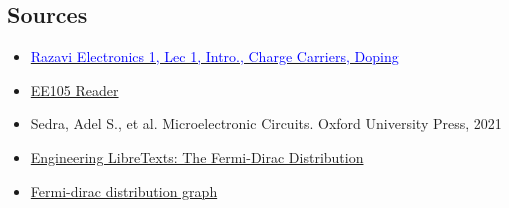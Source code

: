 \subsection{Sources}
\begin{itemize}
    \item \href{https://www.youtube.com/watch?v=yQDfVJzEymI}{\textcolor{blue}{Razavi Electronics 1, Lec 1, Intro., Charge Carriers, Doping}}
    \item \href{https://file.notion.so/f/f/048d6522-202b-48d4-b5d9-bc005bd602e2/214bf1f0-292f-48d6-9016-737d9f5da155/ee105_reader_v3.pdf?id=237a4300-3dbe-47d1-888b-ffae90d8352b&table=block&spaceId=048d6522-202b-48d4-b5d9-bc005bd602e2&expirationTimestamp=1714435200000&signature=yx-H1qvZJIodPfazOpwXX0Ce2mWMG8skOHl45xoPxus&downloadName=ee105_reader_v3.pdf}{EE105 Reader}
    \item Sedra, Adel S., et al. Microelectronic Circuits. Oxford University Press, 2021
    \item \href{https://eng.libretexts.org/Bookshelves/Materials_Science/TLP_Library_II/22%3A_Introduction_to_Semiconductors/22.2%3A_The_FermiDirac_Distribution}{Engineering LibreTexts: The Fermi-Dirac Distribution}
    \item \href{https://tex.stackexchange.com/questions/251496/fermi-dirac-in-pgfplots-dimension-too-lage}{Fermi-dirac distribution graph}
\end{itemize}

